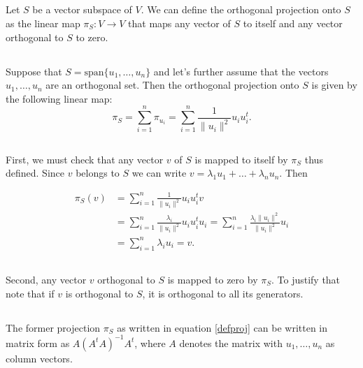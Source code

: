 \documentclass{proc-l}
\theoremstyle{definition}
\theoremstyle{remark}
\numberwithin{equation}{section}
\begin{document}
\subsection{}
Let $S$ be a vector subspace of $V$. We can define the orthogonal projection onto $S$ as the linear map $\pi_S: V\to V$ that maps any vector of $S$ to itself and any vector orthogonal to $S$ to zero. 

\subsection{}
Suppose that $S=\textrm{span}\{u_1,\ldots, u_n\}$ and let's further assume that the vectors $u_1,\ldots, u_n$ are an orthogonal set. Then the orthogonal projection onto $S$ is given by the following linear map:
\begin{equation}\label{defproj}
\pi_{S} = \sum_{i=1}^n \pi_{u_i} = \sum_{i=1}^n \frac{1}{\| u_i \|^2} u_i u_i^t.
\end{equation}

\subsection{}
First, we must check that any vector $v$ of $S$ is mapped to itself by $\pi_S$ thus defined. Since $v$ belongs to $S$ we can write $v = \lambda_1 u_1 + \ldots + \lambda_n u_n$. Then

\begin{align*}
\pi_S(v) &=  \sum_{i=1}^n \frac{1}{\| u_i \|^2} u_i u_i^t v\\ 
&= \sum_{i=1}^n \frac{\lambda_i}{\| u_i \|^2} u_i u_i^t u_i = \sum_{i=1}^n \frac{\lambda_i \| u_i \|^2}{\| u_i \|^2} u_i\\
&= \sum_{i=1}^n \lambda_i u_i = v.
\end{align*}

\subsection{}
Second, any vector $v$ orthogonal to $S$ is mapped to zero by $\pi_S$. To justify that note that if $v$ is orthogonal to $S$, it is orthogonal to all its generators.

\subsection{}
The former projection $\pi_S$ as written in equation \ref{defproj} can be written in matrix form as $A(A^tA)^{-1}A^t$, where $A$ denotes the matrix with $u_1,\ldots,u_n$ as column vectors.
\end{document}
